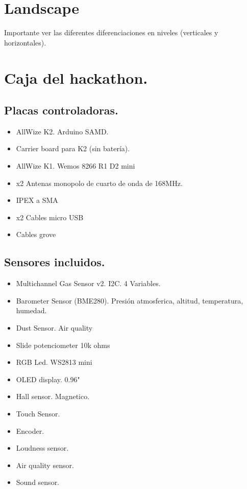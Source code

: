 \documentclass[12pt]{article}
\begin{document}
	\section{Landscape}
	\noindent Importante ver las diferentes diferenciaciones en niveles (verticales y horizontales).
	
	
	\pagebreak
	\section{Caja del hackathon.}
	\subsection{Placas controladoras.}
	\begin{itemize}
		\item AllWize K2. Arduino SAMD. 
		\item Carrier board para K2 (sin batería).
		\item AllWize K1. Wemos 8266 R1 D2 mini 
		\item x2 Antenas monopolo de cuarto de onda de 168MHz.
		\item IPEX a SMA
		\item x2 Cables micro USB
		\item Cables grove
	\end{itemize}
	\subsection{Sensores incluidos.}
	\begin{itemize}
		\item Multichannel Gas Sensor v2. I2C. 4 Variables.
		
		\item Barometer Sensor (BME280). Presión atmosferica, altitud, temperatura, humedad.
		
		\item Dust Sensor. Air quality
		
		\item Slide potenciometer 10k ohms
		
		\item RGB Led. WS2813 mini
		
		\item OLED display. 0.96"
		
		\item Hall sensor. Magnetico.
		
		\item Touch Sensor.
		
		\item Encoder.
		
		\item Loudness sensor.
		
		\item Air quality sensor.
		
		\item Sound sensor.
	\end{itemize}
	
\end{document}
